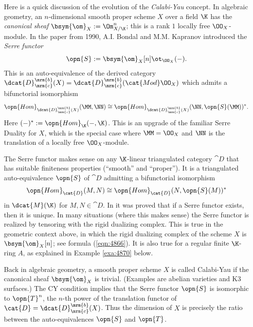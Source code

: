 \begin{rem} \label{rem:4505}
Here is a quick discussion of the evolution of the {\em Calabi-Yau} concept. 
In algebraic geometry, an $n$-dimensional smooth proper scheme $X$ over a field 
$\K$ has the {\em canonical sheaf} $\bsym{\om}_X := \Om^n_{X / \K}$; this is a 
rank $1$ locally free $\OO_X$-module. 
In the paper \cite{BoKa0} from 1990, A.I. Bondal and M.M. Kapranov
introduced the {\em Serre functor}
\begin{equation} \label{eqn:4866}
\opn{S} := \bsym{\om}_X[n] \ot_{\OO_X} (-) . 
\end{equation}
This is an auto-equivalence of the derived category 
$\dcat{D}^{\mrm{b}}_{\mrm{c}}(X) = 
\dcat{D}^{\mrm{b}}_{\mrm{c}}(\cat{Mod} \OO_X)$
which admits a bifunctorial isomorphism 
\begin{equation} \label{eqn:4865}
\opn{Hom}_{\dcat{D}^{\mrm{b}}_{\mrm{c}}(X)}( \MM, \NN) \cong 
\opn{Hom}_{\dcat{D}^{\mrm{b}}_{\mrm{c}}(X)}( \NN, \opn{S}(\MM) )^* .
\end{equation}
Here $(-)^* := \opn{Hom}_{\K}(-, \K)$. 
This is an upgrade of the familiar Serre Duality for $X$, which is the 
special case where $\MM = \OO_X$ and $\NN$ is the translation of a locally free 
$\OO_X$-module. 

The Serre functor makes sense on any $\K$-linear triangulated category 
$\cat{D}$ that has suitable finiteness properties (``smooth'' and ``proper''). 
It is a triangulated auto-equivalence $\opn{S}$ of $\cat{D}$ admitting a 
bifunctorial isomorphism
\begin{equation} \label{eqn:4872}
\opn{Hom}_{\cat{D}}(M, N) \cong \opn{Hom}_{\cat{D}}(N, \opn{S}(M))^* 
\end{equation}
in $\dcat{M}(\K)$ for $M, N \in \cat{D}$. In \cite{BoKa0} it was proved that if 
a Serre functor exists, then it is unique. In many situations (where this makes 
sense) the Serre functor is realized by tensoring with the rigid dualizing 
complex. This is true in the geometric context above, in which the rigid 
dualizing complex of the scheme $X$ is $\bsym{\om}_X[n]$; see formula 
(\ref{eqn:4866}). It is also true for a regular finite $\K$-ring $A$, as 
explained in Example \ref{exa:4870} below. 

Back in algebraic geometry, a smooth proper scheme $X$ is called Calabi-Yau 
if the canonical sheaf $\bsym{\om}_X$ is trivial. (Examples are abelian 
varieties and K3 surfaces.) The CY condition implies that the Serre functor 
$\opn{S}$ is isomorphic to $\opn{T}^n$, the $n$-th power of the 
translation functor of $\cat{D}  = \dcat{D}^{\mrm{b}}_{\mrm{c}}(X)$. 
Thus the dimension of $X$ is precisely the ratio between the 
auto-equivalences $\opn{S}$ and $\opn{T}$. 


\end{rem}
